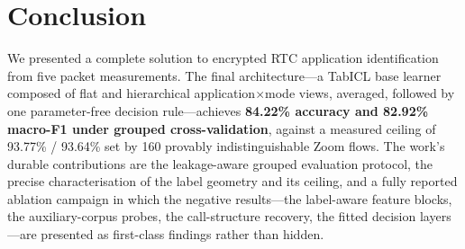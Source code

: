 \documentclass[11pt]{article}
\begin{document}
\section{Conclusion}

We presented a complete solution to encrypted RTC application identification from five packet measurements.
The final architecture---a TabICL base learner composed of flat and hierarchical application$\times$mode
views, averaged, followed by one parameter-free decision rule---achieves \textbf{84.22\% accuracy and
82.92\% macro-F1 under grouped cross-validation}, against a measured ceiling of 93.77\% / 93.64\% set by 160
provably indistinguishable Zoom flows. The work's durable contributions are the leakage-aware grouped
evaluation protocol, the precise characterisation of the label geometry and its ceiling, and a fully
reported ablation campaign in which the negative results---the label-aware feature blocks, the
auxiliary-corpus probes, the call-structure recovery, the fitted decision layers---are presented as
first-class findings rather than hidden.
\end{document}
